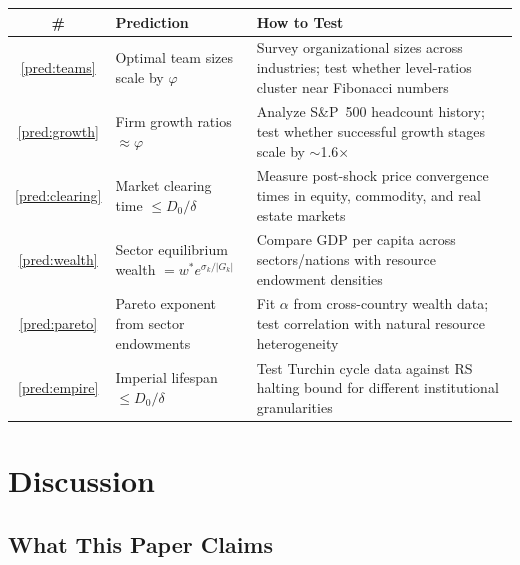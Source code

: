 \documentclass[11pt,a4paper]{article}
\theoremstyle{plain}
\theoremstyle{definition}
\theoremstyle{remark}
\begin{document}
\begin{center}
\renewcommand{\arraystretch}{1.3}
\begin{tabular}{@{}clp{6.5cm}@{}}
\toprule
\textbf{\#} & \textbf{Prediction} & \textbf{How to Test} \\
\midrule
\ref{pred:teams} & Optimal team sizes scale by $\varphi$ & Survey organizational sizes across industries; test whether level-ratios cluster near Fibonacci numbers \\
\ref{pred:growth} & Firm growth ratios $\approx \varphi$ & Analyze S\&P~500 headcount history; test whether successful growth stages scale by $\sim$1.6$\times$ \\
\ref{pred:clearing} & Market clearing time $\le D_0/\delta$ & Measure post-shock price convergence times in equity, commodity, and real estate markets \\
\ref{pred:wealth} & Sector equilibrium wealth $= w^* e^{\sigma_k/|G_k|}$ & Compare GDP per capita across sectors/nations with resource endowment densities \\
\ref{pred:pareto} & Pareto exponent from sector endowments & Fit $\alpha$ from cross-country wealth data; test correlation with natural resource heterogeneity \\
\ref{pred:empire} & Imperial lifespan $\le D_0/\delta$ & Test Turchin cycle data against RS halting bound for different institutional granularities \\
\bottomrule
\end{tabular}
\end{center}

\section{Discussion}\label{sec:discussion}

\subsection{What This Paper Claims}
\end{document}
